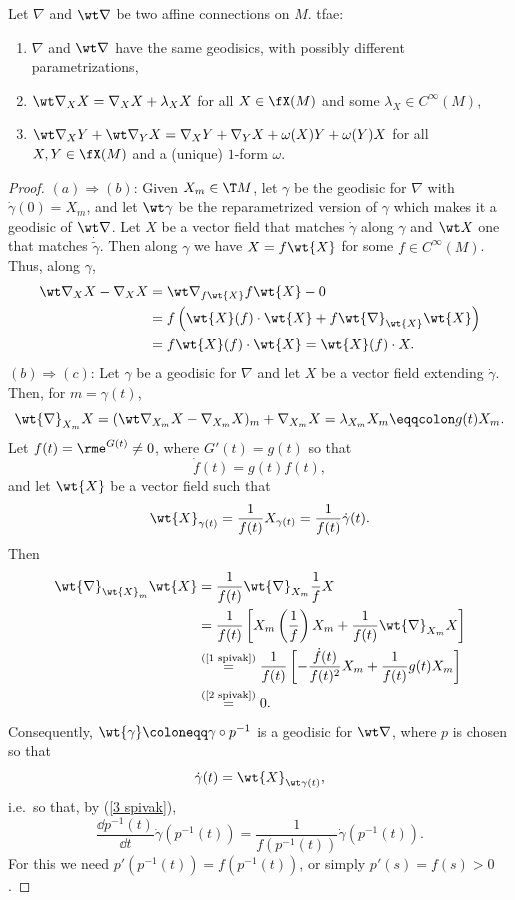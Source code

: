 \begin{prop}
    Let $\nabla$ and $\wt\nabla$ be two affine connections on $M$. \gls{tfae}:
    \begin{enumerate}[label=(\alph*)]
        \item $\nabla$ and $\wt\nabla$ have the same geodisics, with possibly different parametrizations,
        \item $\wt\nabla_X X=\nabla_X X+\lambda_X X$ for all $X\in \fX(M)$ and some $\lambda_X\in C^\infty(M)$,
        \item $\wt\nabla_X Y+\wt\nabla_Y X=\nabla_X Y+\nabla_Y X+\omega(X)Y+\omega(Y)X$ for all $X,Y\in\fX(M)$ and a (unique) $1$-form $\omega$.
    \end{enumerate}    
\end{prop}
\begin{proof}
    $(a)\Rightarrow(b)$: Given $X_m\in \T M$, let $\gamma$  be the geodisic for $\nabla$ with $\dot\gamma(0)=X_m$, and let $\wt\gamma$ be the reparametrized version of $\gamma$ which makes it a geodisic of $\wt\nabla$. Let $X$ be a vector field that matches $\dot\gamma$ along $\gamma$ and $\wt X$ one that matches $\dot{\tilde\gamma}$. Then along $\gamma$ we have $X=f\wt{X}$ for some $f\in C^\infty(M)$. Thus, along $\gamma$,
    \begin{align}
        \wt\nabla_X X-\nabla_X X&= \wt\nabla_{f\wt{X}}f\wt{X}-0\\
        &= f\left(\wt{X}(f)\cdot \wt{X}+f\wt{\nabla}_{\wt{X}}\wt{X}\right)\\
        &= f\wt{X}(f)\cdot \wt{X}=\wt{X}(f)\cdot X.
    \end{align}
    $(b)\Rightarrow(c)$: Let $\gamma$ be a geodisic for $\nabla$ and let $X$ be a vector field extending $\dot\gamma$. Then, for $m=\gamma(t)$,
    \[\wt{\nabla}_{X_m}X=(\wt\nabla_{X_m} X-\nabla_{X_m} X)_m+\nabla_{X_m}X=\lambda_{X_m}X_m\eqqcolon g(t)X_m.\label{1 spivak}\]
    Let $f(t)=\rme^{G(t)}\neq 0$, where $G'(t)=g(t)$ so that 
    \[\dot f(t)=g(t)f(t),\label{2 spivak}\] 
    and let $\wt{X}$ be a vector field such that 
    \[\wt{X}_{\gamma(t)}=\frac{1}{f(t)}X_{\gamma(t)}=\frac{1}{f(t)}\dot\gamma(t).\label{3 spivak}\]
    Then 
    \begin{align}
        \wt{\nabla}_{\wt{X}_m}\wt{X}&= \frac{1}{f(t)}\wt{\nabla}_{X_m}\frac{1}{f}X\\
        &= \frac{1}{f(t)}\left[X_m\left(\frac{1}{f}\right)X_m+\frac{1}{f(t)}\wt{\nabla}_{X_m}X\right]\\
        &\overset{\text{(\ref{1 spivak})}}{=}\frac{1}{f(t)}\left[-\frac{\dot f(t)}{f(t)^2}X_m+\frac{1}{f(t)}g(t)X_m\right]\\
        &\overset{\text{(\ref{2 spivak})}}{=} 0.
    \end{align}
    Consequently, $\wt{\gamma}\coloneqq \gamma\circ p^{-1}$ is a geodisic for $\wt\nabla$, where $p$ is chosen so that 
    \[\dot\gamma(t)=\wt{X}_{\wt\gamma(t)},\]
    i.e.\ so that, by (\ref{3 spivak}),
    \[\frac{\dd p^{-1}(t)}{\dd t}\dot\gamma(p^{-1}(t))=\frac{1}{f(p^{-1}(t))}\dot\gamma(p^{-1}(t)).\]
    For this we need $p'(p^{-1}(t))=f(p^{-1}(t))$, or simply $p'(s)=f(s)>0$.


\end{proof}

